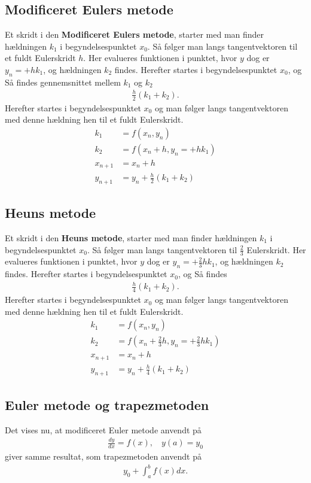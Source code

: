 \subsection*{Modificeret Eulers metode}
Et skridt i den \textbf{Modificeret Eulers metode}, starter med man finder hældningen $k_1$ i begyndelsespunktet $x_0$.
Så følger man langs tangentvektoren til et fuldt Eulerskridt $h$.
Her evalueres funktionen i punktet, hvor $y$ dog er $ y_n = + h k_1$,
og hældningen $k_2$ findes. 
Herefter startes i begyndelsespunktet $x_0$, og 
Så findes gennemsnittet mellem $k_1$ og $k_2$ 
\begin{align*}
\frac{h}{2} (k_1 + k_2 ).
\end{align*}
Herefter startes i begyndelsespunktet $x_0$ og man følger langs tangentvektoren med denne hældning hen til et fuldt Eulerskridt.
%
\begin{align*}
k_1 & = f(x_n , y_n) \\
k_2 & = f( x_n + h , y_n = + h k_1 ) \\
x_{n+1} & = x_n+h \\
y_{n+1} & = y_n + \frac{h}{2} (k_1 + k_2 )
\end{align*}
% 

%
\subsection*{Heuns metode}
Et skridt i den \textbf{Heuns metode}, starter med man finder hældningen $k_1$ i begyndelsespunktet $x_0$.
Så følger man langs tangentvektoren til $\frac{2}{3}$ Eulerskridt.
Her evalueres funktionen i punktet, hvor $y$ dog er $y_n = + \frac{2}{3} h k_1$,
og hældningen $k_2$ findes. 
Herefter startes i begyndelsespunktet $x_0$, og 
Så findes
\begin{align*}
\frac{h}{4} (k_1 + k_2 ).
\end{align*}
Herefter startes i begyndelsespunktet $x_0$ og man følger langs tangentvektoren med denne hældning hen til et fuldt Eulerskridt.
%
\begin{align*}
k_1 & = f(x_n , y_n) \\
k_2 & = f \left( x_n + \frac{2}{3} h , y_n = + \frac{2}{3} h k_1 \right) \\
x_{n+1} & = x_n+h \\
y_{n+1} & = y_n + \frac{h}{4} (k_1 + k_2 )
\end{align*}
%

%
\subsection*{Euler metode og trapezmetoden}
%
Det vises nu, at modificeret Euler metode anvendt på
\begin{align*}
\frac{dy}{dx}=f(x),\phantom{hi}y(a)=y_0
\end{align*}
%
giver samme resultat, som trapezmetoden anvendt på
%
\begin{align*}
y_0 + \int_a^b f(x) dx.
\end{align*}
%